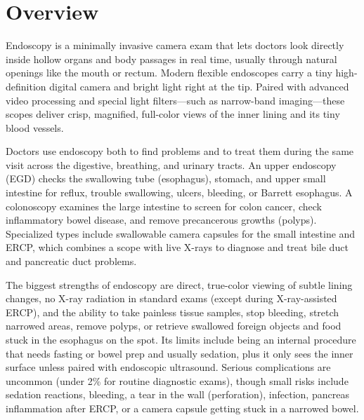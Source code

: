 \label{ch:infographic-endoscopy}

\section{Overview}

Endoscopy is a minimally invasive camera exam that lets doctors look directly inside hollow organs and body passages in real time, usually through natural openings like the mouth or rectum. Modern flexible endoscopes carry a tiny high-definition digital camera and bright light right at the tip. Paired with advanced video processing and special light filters---such as narrow-band imaging---these scopes deliver crisp, magnified, full-color views of the inner lining and its tiny blood vessels.

Doctors use endoscopy both to find problems and to treat them during the same visit across the digestive, breathing, and urinary tracts. An upper endoscopy (EGD) checks the swallowing tube (esophagus), stomach, and upper small intestine for reflux, trouble swallowing, ulcers, bleeding, or Barrett esophagus. A colonoscopy examines the large intestine to screen for colon cancer, check inflammatory bowel disease, and remove precancerous growths (polyps). Specialized types include swallowable camera capsules for the small intestine and ERCP, which combines a scope with live X-rays to diagnose and treat bile duct and pancreatic duct problems.

The biggest strengths of endoscopy are direct, true-color viewing of subtle lining changes, no X-ray radiation in standard exams (except during X-ray-assisted ERCP), and the ability to take painless tissue samples, stop bleeding, stretch narrowed areas, remove polyps, or retrieve swallowed foreign objects and food stuck in the esophagus on the spot. Its limits include being an internal procedure that needs fasting or bowel prep and usually sedation, plus it only sees the inner surface unless paired with endoscopic ultrasound. Serious complications are uncommon (under 2\% for routine diagnostic exams), though small risks include sedation reactions, bleeding, a tear in the wall (perforation), infection, pancreas inflammation after ERCP, or a camera capsule getting stuck in a narrowed bowel.

